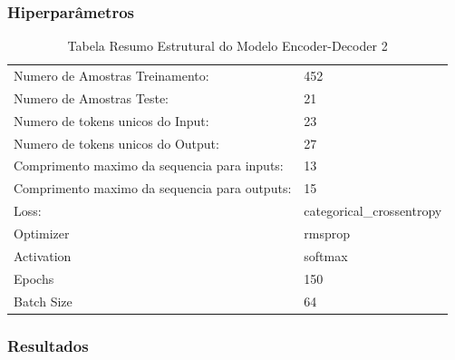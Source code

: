 \subsubsection{Hiperparâmetros} 



\begin{table}[H]
\centering
\begin{tabular}{ll}
Numero de Amostras Treinamento: & 452 \\
Numero de Amostras Teste: & 21 \\
Numero de tokens unicos do Input: & 23 \\
Numero de tokens unicos do Output: & 27 \\
Comprimento maximo da sequencia para inputs: & 13 \\
Comprimento maximo da sequencia para outputs: & 15 \\
Loss: & categorical\_crossentropy \\
Optimizer & rmsprop \\
Activation & softmax \\
Epochs & 150 \\
Batch Size & 64
\end{tabular}
\caption{Tabela Resumo Estrutural do Modelo Encoder-Decoder 2}
\label{tab:resumo21}
\end{table}

\subsubsection{Resultados}

